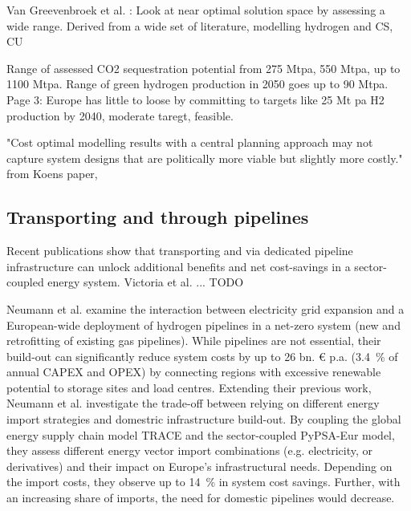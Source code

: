 \documentclass[preprint,12pt,sort&compress]{elsarticle}
\begin{document}
Van Greevenbroek et al. \cite{greevenbroekLittleLoseCase2024}: Look at near optimal solution space by assessing a wide range. Derived from a wide set of literature, modelling hydrogen and CS, CU \cite{fleiterHydrogenInfrastructureFuture2025,beresWillHydrogenSynthetic2024,blancoPotentialHydrogenPowertoLiquid2018,pickeringDiversityOptionsEliminate2022,schreyerDistinctRolesDirect2024,seckHydrogenDecarbonizationEnergy2022,neumannPotentialRoleHydrogen2023,zeyenEndogenousLearningGreen2023,kountourisUnifiedEuropeanHydrogen2024}

Range of assessed CO2 sequestration potential from 275 Mtpa, 550 Mtpa,  up to 1100 Mtpa. Range of green hydrogen production in 2050 goes up to 90 Mtpa. Page 3: Europe has little to loose by committing to targets like 25 Mt pa H2 production by 2040, moderate taregt, feasible.

"Cost optimal modelling results with a central planning approach may not capture system designs that are politically more viable but slightly more costly." from Koens paper, \cite{trutnevyteDoesCostOptimization2016}

\subsection{Transporting  and  through pipelines}
Recent publications show that transporting  and  via dedicated pipeline infrastructure can unlock additional benefits and net cost-savings in a sector-coupled energy system. Victoria et al. \cite{victoriaSpeedTechnologicalTransformations2022a} ... TODO

Neumann et al. \cite{neumannPotentialRoleHydrogen2023} examine the interaction between electricity grid expansion and a European-wide deployment of hydrogen pipelines in a net-zero system (new and retrofitting of existing gas pipelines). While  pipelines are not essential, their build-out can significantly reduce system costs by up to 26 bn. \euro{} p.a. (\SI{3.4}{\percent} of annual CAPEX and OPEX) by connecting regions with excessive renewable potential to storage sites and load centres. 
Extending their previous work, Neumann et al. \cite{neumannEnergyImportsInfrastructure2024} investigate the trade-off between relying on different energy import strategies and domestric infrastructure build-out. By coupling the global energy supply chain model TRACE \cite{hamppImportOptionsChemical2023} and the sector-coupled PyPSA-Eur model, they assess different energy vector import combinations (e.g. electricity,  or  derivatives) and their impact on Europe's infrastructural needs. Depending on the import costs, they observe up to \SI{14}{\percent} in system cost savings. Further, with an increasing share of  imports, the need for domestic  pipelines would decrease. 
\end{document}

